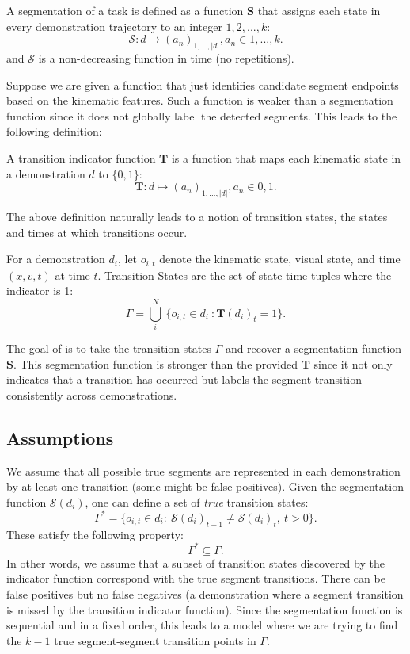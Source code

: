 \begin{definition}[Segmentation]
A segmentation of a task is defined as a function $\mathbf{S}$ that assigns each state in every demonstration trajectory to an integer $1,2,...,k$:
\[
\mathcal{S}: d \mapsto (a_n)_{1,...,|d|}, a_n \in {1,...,k}.
\]
and $\mathcal{S}$ is a non-decreasing function in time (no repetitions).
\end{definition}

Suppose we are given a function that just identifies candidate segment endpoints based on the kinematic features.
Such a function is weaker than a segmentation function since it does not globally label the detected segments.
This leads to the following definition:

\begin{definition}
A transition indicator function $\mathbf{T}$ is a function that maps each kinematic state in a demonstration $d$ to $\{0,1\}$:
\[
\mathbf{T}: d \mapsto (a_n)_{1,...,|d|}, a_n \in {0,1}.
\]
\end{definition}

The above definition naturally leads to a notion of transition states, the states and times at which transitions occur.

\begin{definition}
For a demonstration $d_i$, let $o_{i,t}$ denote the kinematic state, visual state, and time $(x,v,t)$ at time $t$.
Transition States are the set of state-time tuples where the indicator is 1:
\[
\Gamma = \bigcup_{i}^N ~\{o_{i,t} \in d_i ~: \mathbf{T}(d_i)_t = 1\}.
\]
\end{definition}

The goal of \tsc is to take the transition states $\Gamma$ and recover a segmentation function $\mathbf{S}$. This segmentation function is stronger than the provided $\mathbf{T}$ since it not only indicates that a transition has occurred but labels the segment transition consistently across demonstrations.

\subsection*{Assumptions}
We assume that all possible true segments are represented in each demonstration by at least one transition (some might be false positives).
Given the segmentation function $\mathcal{S}(d_i)$, one can define a set of \emph{true} transition states:
\[\Gamma^* = \{
o_{i,t} \in d_i : ~\mathcal{S}(d_i)_{t-1} \ne \mathcal{S}(d_i)_t,~ t > 0\}.
\]
These satisfy the following property:
\[
 \Gamma^* \subseteq \Gamma.
\]
In other words, we assume that a subset of transition states discovered by the indicator function correspond with the true segment transitions.
There can be false positives but no false negatives (a demonstration where a segment transition is missed by the transition indicator function).
Since the segmentation function is sequential and in a fixed order, this leads to a model where we are trying to find the $k-1$ true segment-segment transition points in $\Gamma$.

